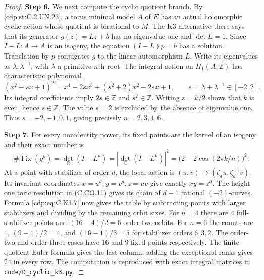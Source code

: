 \begin{proof}
\noindent\textbf{Step 6.} We next compute the cyclic quotient branch. By
\ref{cdp:st:C.2.UN.23}, a torus minimal model $A$ of $E$ has an
actual holomorphic cyclic action whose quotient is
birational to $M$. The K3 alternative there says that
its generator $g(z)=Lz+b$ has no eigenvalue one and
$\det L=1$. Since $I-L:A\to A$ is an isogeny, the
equation $(I-L)p=b$ has a solution. Translation by
$p$ conjugates $g$ to the linear automorphism $L$.
Write its eigenvalues as $\lambda,\lambda^{-1}$,
with $\lambda$ a primitive $n$th root. The integral
action on $H_1(A,\mathbb Z)$ has characteristic polynomial
\[
 (x^2-sx+1)^2
   =x^4-2sx^3+(s^2+2)x^2-2sx+1,
 \qquad s=\lambda+\lambda^{-1}\in[-2,2].
                                                               \tag{C.K3.6}\label{cdp:eq:C.K3.6}
\]
Its integral coefficients imply $2s\in\mathbb Z$
and $s^2\in\mathbb Z$. Writing $s=k/2$ shows that
$k$ is even, hence $s\in\mathbb Z$. The value $s=2$
is excluded by the absence of eigenvalue one.
Thus $s=-2,-1,0,1$, giving precisely
$n=2,3,4,6$.

\noindent\textbf{Step 7.} For every nonidentity power, its fixed points are the
kernel of an isogeny and their exact number is
\[
 \#\operatorname{Fix}(g^k)
 =\det_{\mathbb R}(I-L^k)
 =|\det_{\mathbb C}(I-L^k)|^2
 =\bigl(2-2\cos(2\pi k/n)\bigr)^2.
                                                               \tag{C.K3.7}\label{cdp:eq:C.K3.7}
\]
At a point with stabilizer of order $d$, the local
action is $(u,v)\mapsto(\zeta_du,\zeta_d^{-1}v)$.
Its invariant coordinates $x=u^d,y=v^d,z=uv$ give
exactly $xy=z^d$. The height-one toric resolution
in (C.CQ.11) gives its chain of $d-1$ rational
$(-2)$-curves. Formula \eqref{cdp:eq:C.K3.7} now gives the table
by subtracting points with larger stabilizers and
dividing by the remaining orbit sizes. For $n=4$
there are $4$ full-stabilizer points and
$(16-4)/2=6$ order-two orbits. For $n=6$ the
counts are $1$, $(9-1)/2=4$, and
$(16-1)/3=5$ for stabilizer orders $6,3,2$.
The order-two and order-three cases have $16$ and
$9$ fixed points respectively. The finite quotient
Euler formula gives the last column; adding the
exceptional ranks gives $24$ in every row.
The computation is reproduced with exact integral
matrices in \texttt{code/D\_cyclic\_k3.py}.


\end{proof}
